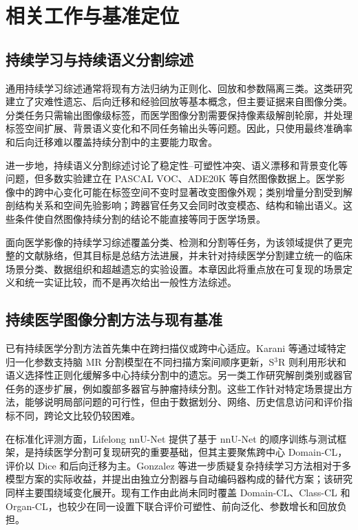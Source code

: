\section{相关工作与基准定位}
\label{sec:benchmark-related-work}

\subsection{持续学习与持续语义分割综述}

通用持续学习综述通常将现有方法归纳为正则化、回放和参数隔离三类\cite{wang2024continualsurvey}。这类研究建立了灾难性遗忘、后向迁移和经验回放等基本概念，但主要证据来自图像分类。分类任务只需输出图像级标签，而医学图像分割需要保持像素级解剖轮廓，并处理标签空间扩展、背景语义变化和不同任务输出头等问题。因此，只使用最终准确率和后向迁移难以覆盖持续分割中的主要能力取舍。

进一步地，持续语义分割综述讨论了稳定性--可塑性冲突、语义漂移和背景变化等问题\cite{yuan2024continualseg}，但多数实验建立在 PASCAL VOC、ADE20K 等自然图像数据上。医学影像中的跨中心变化可能在标签空间不变时显著改变图像外观；类别增量分割受到解剖结构关系和空间先验影响；跨器官任务又会同时改变模态、结构和输出语义。这些条件使自然图像持续分割的结论不能直接等同于医学场景。

面向医学影像的持续学习综述覆盖分类、检测和分割等任务\cite{kumari2025medicalcl}，为该领域提供了更完整的文献脉络，但其目标是总结方法进展，并未针对持续医学分割建立统一的临床场景分类、数据组织和超越遗忘的实验设置。本章因此将重点放在可复现的场景定义和统一实证比较，而不是再次给出一般性方法综述。

\subsection{持续医学图像分割方法与现有基准}

已有持续医学分割方法首先集中在跨扫描仪或跨中心适应。Karani 等通过域特定归一化参数支持脑 MR 分割模型在不同扫描方案间顺序更新\cite{karani2018lifelong}，S$^3$R 则利用形状和语义选择性正则化缓解多中心持续分割中的遗忘\cite{zhang2023s3r}。另一类工作研究解剖类别或器官任务的逐步扩展，例如腹部多器官与肿瘤持续分割\cite{zhang2023continualorgan}。这些工作针对特定场景提出方法，能够说明局部问题的可行性，但由于数据划分、网络、历史信息访问和评价指标不同，跨论文比较仍较困难。

在标准化评测方面，Lifelong nnU-Net 提供了基于 nnU-Net 的顺序训练与测试框架，是持续医学分割可复现研究的重要基础\cite{gonzalez2023lifelong}，但其主要聚焦跨中心 Domain-CL，评价以 Dice 和后向迁移为主。Gonzalez 等进一步质疑复杂持续学习方法相对于多模型方案的实际收益，并提出由独立分割器与自动编码器构成的替代方案\cite{whatwrong}；该研究同样主要围绕域变化展开。现有工作由此尚未同时覆盖 Domain-CL、Class-CL 和 Organ-CL，也较少在同一设置下联合评价可塑性、前向泛化、参数增长和回放负担。

